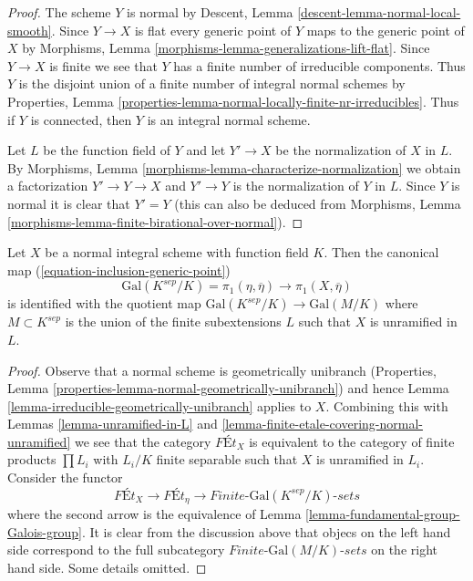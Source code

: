 \begin{proof}
The scheme $Y$ is normal by
Descent, Lemma \ref{descent-lemma-normal-local-smooth}.
Since $Y \to X$ is flat every generic point of $Y$ maps
to the generic point of $X$ by
Morphisms, Lemma \ref{morphisms-lemma-generalizations-lift-flat}.
Since $Y \to X$ is finite we see that $Y$ has a finite number
of irreducible components. Thus $Y$ is the disjoint union of
a finite number of integral normal schemes by
Properties, Lemma \ref{properties-lemma-normal-locally-finite-nr-irreducibles}.
Thus if $Y$ is connected, then $Y$ is an integral normal scheme.

\medskip\noindent
Let $L$ be the function field of $Y$ and let $Y' \to X$ be the normalization
of $X$ in $L$. By
Morphisms, Lemma \ref{morphisms-lemma-characterize-normalization}
we obtain a factorization $Y' \to Y \to X$ and $Y' \to Y$ is
the normalization of $Y$ in $L$. Since $Y$ is normal it is clear
that $Y' = Y$ (this can also be deduced from
Morphisms, Lemma \ref{morphisms-lemma-finite-birational-over-normal}).
\end{proof}

\begin{proposition}
\label{proposition-normal}
Let $X$ be a normal integral scheme with function field $K$.
Then the canonical map (\ref{equation-inclusion-generic-point})
$$
\text{Gal}(K^{sep}/K) = \pi_1(\eta, \overline{\eta})
\longrightarrow \pi_1(X, \overline{\eta})
$$
is identified with the quotient map
$\text{Gal}(K^{sep}/K) \to \text{Gal}(M/K)$ where $M \subset K^{sep}$
is the union of the finite subextensions $L$
such that $X$ is unramified in $L$.
\end{proposition}

\begin{proof}
Observe that a normal scheme is geometrically unibranch
(Properties, Lemma \ref{properties-lemma-normal-geometrically-unibranch})
and hence Lemma \ref{lemma-irreducible-geometrically-unibranch} applies to $X$.
Combining this with Lemmas \ref{lemma-unramified-in-L} and
\ref{lemma-finite-etale-covering-normal-unramified}
we see that the category $\textit{F\'Et}_X$ is equivalent to
the category of finite products $\prod L_i$ with $L_i/K$ finite
separable such that $X$ is unramified in $L_i$. Consider the functor
$$
\textit{F\'Et}_X \longrightarrow
\textit{F\'Et}_\eta \longrightarrow
\textit{Finite-}\text{Gal}(K^{sep}/K)\textit{-sets}
$$
where the second arrow is the equivalence of
Lemma \ref{lemma-fundamental-group-Galois-group}.
It is clear from the discussion above that objecs on the left hand
side correspond to the full subcategory
$\textit{Finite-}\text{Gal}(M/K)\textit{-sets}$
on the right hand side. Some details omitted.
\end{proof}









